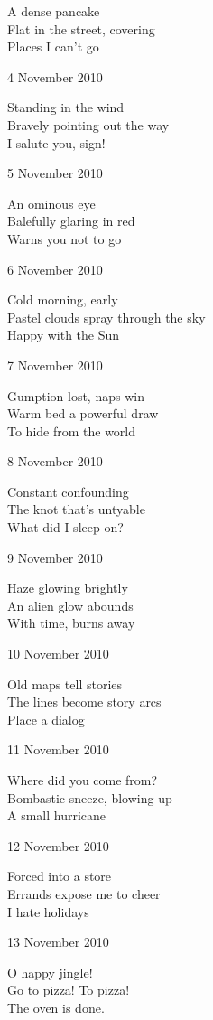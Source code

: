 \documentclass[12pt]{article}
\begin{document}
A dense pancake \\
Flat in the street, covering \\
Places I can't go

4 November 2010

Standing in the wind \\
Bravely pointing out the way \\
I salute you, sign!

5 November 2010

An ominous eye \\
Balefully glaring in red \\
Warns you not to go

6 November 2010

Cold morning, early \\
Pastel clouds spray through the sky \\
Happy with the Sun

7 November 2010

Gumption lost, naps win \\
Warm bed a powerful draw \\
To hide from the world

8 November 2010

Constant confounding \\
The knot that's untyable \\
What did I sleep on?

9 November 2010

Haze glowing brightly \\
An alien glow abounds \\
With time, burns away


\newpage

10 November 2010

Old maps tell stories \\
The lines become story arcs \\
Place a dialog

11 November 2010

Where did you come from? \\
Bombastic sneeze, blowing up \\
A small hurricane

12 November 2010

Forced into a store \\
Errands expose me to cheer \\
I hate holidays

13 November 2010

O happy jingle! \\
Go to pizza! To pizza! \\
The oven is done.
\end{document}
